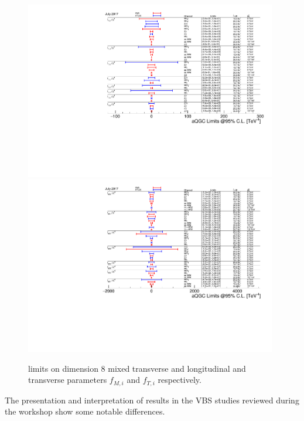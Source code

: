 \begin{figure}[h!]
    \begin{center}
    \includegraphics[width=11cm,scale=1]{figures/aQGC_ft}
    \includegraphics[width=11cm,scale=1]{figures/aQGC_fm-2}
    \end{center}
    \caption{limits on dimension 8 mixed transverse and longitudinal and transverse parameters $f_{M,i}$ and $f_{T,i}$ respectively.}
    \label{fig:EFT}
\end{figure}


The presentation and interpretation of results in the VBS studies reviewed during the workshop show some notable differences.


